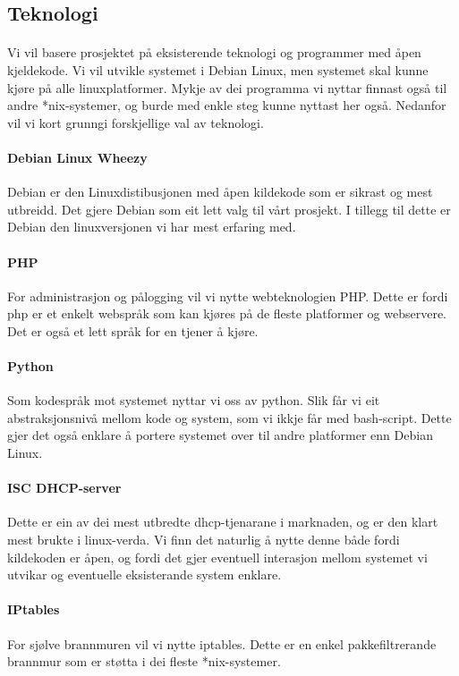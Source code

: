 \documentclass[nynorsk,12pt,a4paper]{article}
\begin{document}
\subsection{Teknologi}
\paragraph{}
Vi vil basere prosjektet på eksisterende teknologi og programmer med åpen kjeldekode. Vi vil utvikle systemet i Debian Linux, men systemet skal kunne kjøre på alle linuxplatformer. Mykje av dei programma vi nyttar finnast også til andre *nix-systemer, og burde med enkle steg kunne nyttast her også. Nedanfor vil vi kort grunngi forskjellige val av teknologi. 
\paragraph{Debian Linux Wheezy}
Debian er den Linuxdistibusjonen med åpen kildekode som er sikrast og mest utbreidd. Det gjere Debian som eit lett valg til vårt prosjekt. I tillegg til dette er Debian den linuxversjonen vi har mest erfaring med.
\paragraph{PHP}
For administrasjon og pålogging vil vi nytte webteknologien PHP. Dette er fordi php er et enkelt webspråk som kan kjøres på de fleste platformer og webservere. Det er også et lett språk for en tjener å kjøre.
\paragraph{Python}
Som kodespråk mot systemet nyttar vi oss av python. Slik får vi eit abstraksjonsnivå mellom kode og system, som vi ikkje får med bash-script. Dette gjer det også enklare å portere systemet over til andre platformer enn Debian Linux. 
\paragraph{ISC DHCP-server}
Dette er ein av dei mest utbredte dhcp-tjenarane i marknaden, og er den klart mest brukte i linux-verda. Vi finn det naturlig å nytte denne både fordi kildekoden er åpen, og fordi det gjer eventuell interasjon mellom systemet vi utvikar og eventuelle eksisterande system enklare. 
\paragraph{IPtables}
For sjølve brannmuren vil vi nytte iptables. Dette er en enkel pakkefiltrerande brannmur som er støtta i dei fleste *nix-systemer. 
\end{document}
